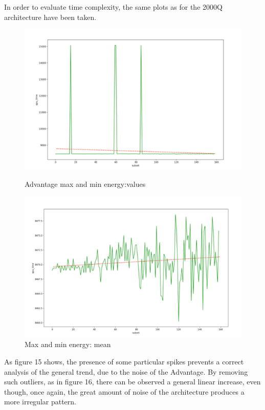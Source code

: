 \documentclass[oneside,a4paper]{article}
\begin{document}
In order to evaluate time complexity, the same plots as for the 2000Q architecture have been taken.

\begin{figure}[htp]
\centering
\begin{minipage}[b]{12.5cm}
\includegraphics[width=12.5cm]{LaTeXTemplate/Images/AdvantagefirstT2.png}
\caption{Advantage max and min energy:values}
\end{minipage}
\begin{minipage}[b]{12cm}
\includegraphics[width=12cm]{LaTeXTemplate/Images/AdvantagefirstT1.png}
\caption{Max and min energy: mean}
\end{minipage}
\end{figure}
As figure 15 shows, the presence of some particular spikes prevents a correct analysis of the general trend, due to the noise of the Advantage. By removing such outliers, as in figure 16, 
there can be observed a general linear increase, even though, once again, the great amount of noise of the architecture produces a more irregular pattern.
\newpage
\end{document}
